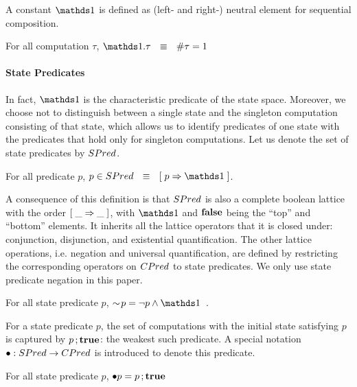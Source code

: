 A constant $\one$ is defined as (left- and right-) neutral element for
sequential composition.
\begin{Definition} For all
  computation $\tau$, $\one.\tau  \Wide{\eqv}  \size \tau = 1$
\end{Definition}

\paragraph{State Predicates}
In fact, $\one$ is the characteristic predicate of the state space.
Moreover, we choose not to distinguish between a single state and the
singleton computation consisting of that state, which allows us to identify
predicates of one state with the predicates that hold only for singleton
computations.  Let us denote the set of state predicates by 
$SPred$.
\begin{Definition} For all predicate $p$,
    $p \in \SPred \Wide{\eqv} \ew {p \implies \one}$.
\end{Definition}

A consequence of this definition is that $SPred$ is also a complete
boolean lattice with the order $[\;  \_ \Rightarrow \_ \;]$, with $\one$ and
$\mathbf{false}$ being the ``top'' and ``bottom'' elements.  It inherits all
the lattice operators that it is closed under: conjunction,
disjunction, and existential quantification.  The other lattice
operations, i.e. negation and universal quantification, are defined by
restricting the corresponding operators on $CPred$ to state
predicates.  We only use state predicate negation in this paper.
\begin{Definition} For
  all state predicate $p$,
  $\spneg p = \neg p \land \one$~.
\end{Definition}

For a state predicate $p$, the set of computations with the initial
state satisfying $p$ is captured by $p\,;\mathbf{true}$: the weakest such 
predicate.  A special notation $\bullet : SPred \rightarrow CPred$ 
is introduced to denote this predicate.
\begin{Definition} For all state predicate $p$,
  $\bullet p = p\,;\mathbf{true}$
\end{Definition}

